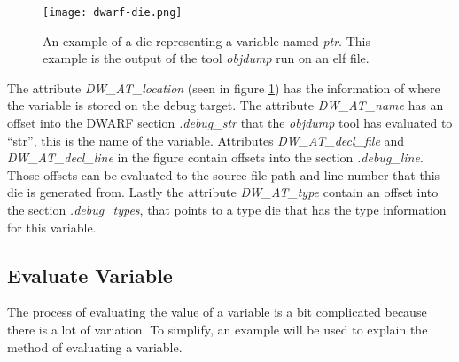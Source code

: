 \begin{figure}[h]
	\centering
	\texttt{[image: dwarf-die.png]}
	\caption{An example of a \gls{die} representing a variable named \emph{ptr}. This example is the output of the tool \emph{objdump} run on an \gls{elf} file.}
	\label{fig:dwarfdie}
\end{figure}


The attribute \emph{DW\_AT\_location} (seen in figure \ref{fig:dwarfdie}) has the information of where the variable is stored on the debug target.
The attribute \emph{DW\_AT\_name} has an offset into the \gls{DWARF} section \emph{.debug\_str} that the \emph{objdump} tool has evaluated to ``str'', this is the name of the variable.
Attributes \emph{DW\_AT\_decl\_file} and \emph{DW\_AT\_decl\_line} in the figure contain  offsets into the section \emph{.debug\_line}.
Those offsets can be evaluated to the source file path and line number that this \gls{die} is generated from.
Lastly the attribute \emph{DW\_AT\_type} contain an offset into the section \emph{.debug\_types}, that points to a type \gls{die} that has the type information for this variable.



\subsection{Evaluate Variable}
\label{sec:evaluate-variable}
 


The process of evaluating the value of a variable is a bit complicated because there is a lot of variation.
To simplify, an example will be used to explain the method of evaluating a variable.



